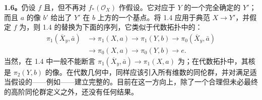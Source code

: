 \textbf{1.6。}仍设 $f$ 且，但不再对 $f_*(\mathcal O_X)$ 作假设。它对应于 $Y$ 的一个完全确定的 $Y'$；而且 $a$ 的像 $b'$ 给出了 $Y'$ 在 $b$ 上方的一个基点。将 1.4 应用于典范 $X\to Y'$，并假定 $f$ 为，则 1.4 的替换为下面的序列，它类似于代数拓扑中的：
\[
\begin{aligned}
\pi_1(\overline X_y,\bar a)&\longrightarrow\pi_1(X,a)\longrightarrow\pi_1(Y,b)
\longrightarrow\pi_0(\overline X_y,\bar a)\\
&\longrightarrow\pi_0(X,a)\longrightarrow\pi_0(Y,b)\longrightarrow e.
\end{aligned}
\]
当然，在 1.4 中一般不能断言 $\pi_1(\overline X_y,\bar a)\to\pi_1(X,a)$ 为；在代数拓扑中，其核是 $\pi_2(Y,b)$ 的像。在代数几何中，同样应该引入所有维数的同伦群，并对满足适当假设的——例如——建立完整的。目前在这一方向上，除了一个合理但未必最终的高阶同伦群定义之外，还没有任何结果。

